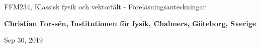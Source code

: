 \documentclass[%
oneside,                 %
final,                   %
10pt]{article}
\begin{document}

\newcommand{\exercisesection}[1]{\subsection*{#1}}







\thispagestyle{empty}

\begin{center}
{\LARGE\bf
\begin{spacing}{1.25}
FFM234, Klassisk fysik och vektorfält - Föreläsningsanteckningar
\end{spacing}
}
\end{center}


\begin{center}
{\bf \href{{http://fy.chalmers.se/subatom/tsp/}}{Christian Forssén}, Institutionen för fysik, Chalmers, Göteborg, Sverige${}^{}$} \\ [0mm]
\end{center}

\begin{center}
\end{center}
    

\begin{center}
Sep 30, 2019
\end{center}

\vspace{1cm}
\end{document}
